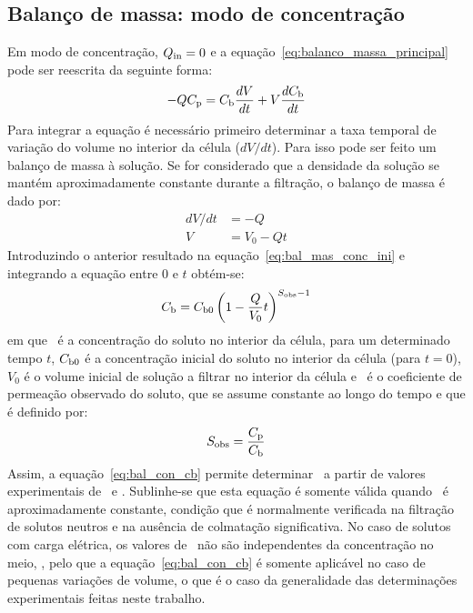 \subsection{Balanço de massa: modo de concentração} %
\label{sub:modo_con}
Em modo de concentração, $Q_{\mathrm{in}}=0$ e a equação~\ref{eq:balanco_massa_principal} pode ser reescrita da seguinte forma:
\begin{equation}
	\label{eq:bal_mas_conc_ini}
	-QC_{\mathrm{p}}=C_{\mathrm{b}}\frac{dV}{dt}+V\frac{dC_{\mathrm{b}}}{dt}
\end{equation}
Para integrar a equação é necessário primeiro determinar a taxa temporal de variação do volume no interior da célula ($dV/dt$). Para isso pode ser feito um balanço de massa à solução. Se for considerado que a densidade da solução se mantém aproximadamente constante durante a filtração, o balanço de massa é dado por:
\begin{equation}
 	\begin{aligned}
 	dV/dt & = -Q\\
 	    V & = V_0-Qt
 	\end{aligned}
\end{equation}
Introduzindo o anterior resultado na equação~\ref{eq:bal_mas_conc_ini} e integrando a equação entre 0 e $t$ obtém-se:
\begin{equation}
	\label{eq:bal_con_cb}
	C_{\mathrm{b}}=C_{\mathrm{b0}}\left( 1-\frac{Q}{V_0}t\right)^{S_{\mathrm{obs}}-1}
\end{equation}
em que \concb\ é a concentração do soluto no interior da célula, para um determinado tempo $t$, $C_{\mathrm{b0}}$ é a concentração inicial do soluto no interior da célula (para $t=0$), $V_0$ é o volume inicial de solução a filtrar no interior da célula e \permobs\ é o coeficiente de permeação observado do soluto, que se assume constante ao longo do tempo e que é definido por:
\begin{equation}
	\label{eq:permobs_pra}
 	S_{\mathrm{obs}}=\frac{C_{\mathrm{p}}}{C_{\mathrm{b}}}
 \end{equation}
Assim, a equação~\ref{eq:bal_con_cb} permite determinar \permobs\ a partir de valores experimentais de \concb\ e \concp. Sublinhe-se que esta equação é somente válida quando \permobs\ é aproximadamente constante, condição que é normalmente verificada na filtração de solutos neutros e na ausência de colmatação significativa. No caso de solutos com carga elétrica, os valores de \permobs\ não são independentes da concentração no meio, \concb, pelo que a equação~\ref{eq:bal_con_cb} é somente aplicável no caso de pequenas variações de volume, o que é o caso da generalidade das determinações experimentais feitas neste trabalho.

